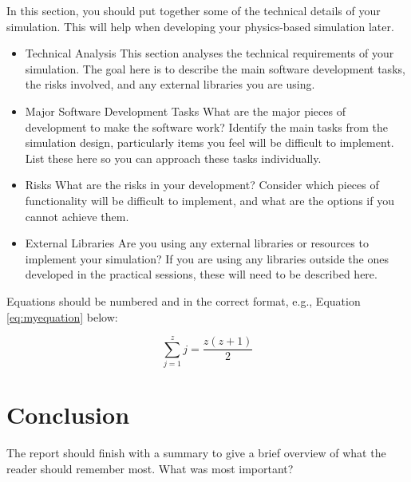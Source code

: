 \documentclass[conference]{acmsiggraph}
\begin{document}
In this section, you should put together some of the technical details of your simulation.  This will help when developing your physics-based simulation later.

\begin{itemize}
\item {Technical Analysis} This section analyses the technical requirements of your simulation.  The goal here is to describe the main software development tasks, the risks involved, and any external libraries you are using.
\item {Major Software Development Tasks} What are the major pieces of development to make the software work?  Identify the main tasks from the simulation design, particularly items you feel will be difficult to implement.  List these here so you can approach these tasks individually.
\item {Risks} What are the risks in your development?  Consider which pieces of functionality will be difficult to implement, and what are the options if you cannot achieve them.
\item {External Libraries} Are you using any external libraries or resources to implement your simulation?  If you are using any libraries outside the ones developed in the practical sessions, these will need to be described here.
\end{itemize}


Equations should be numbered and in the correct format, e.g., Equation \ref{eq:myequation} below:

\begin{equation} \label{eq:myequation}
 \sum_{j=1}^{z} j = \frac{z(z+1)}{2}
\end{equation}


\section{Conclusion}
The report should finish with a summary to give a brief overview of what the reader should remember most.  What was most important?






\end{document}

